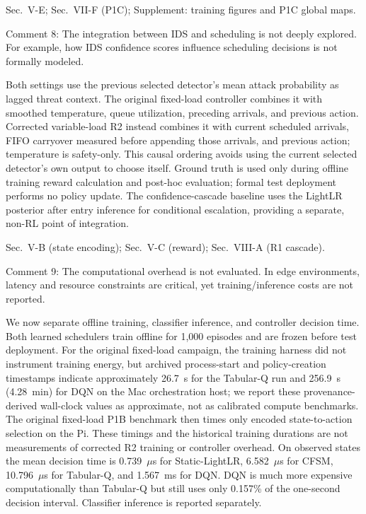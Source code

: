 \documentclass[10pt,a4paper]{article}
\begin{document}
\begin{wherebox}
Sec.~V-E; Sec.~VII-F (P1C); Supplement: training figures and P1C global maps.
\end{wherebox}

\begin{rcommentbox}
Comment 8: The integration between IDS and scheduling is not deeply explored. For example, how IDS confidence scores influence scheduling decisions is not formally modeled.
\end{rcommentbox}

\begin{authorresponsebox}
Both settings use the previous selected detector's mean attack probability as lagged threat context. The original fixed-load controller combines it with smoothed temperature, queue utilization, preceding arrivals, and previous action. Corrected variable-load R2 instead combines it with current scheduled arrivals, FIFO carryover measured before appending those arrivals, and previous action; temperature is safety-only. This causal ordering avoids using the current selected detector's own output to choose itself. Ground truth is used only during offline training reward calculation and post-hoc evaluation; formal test deployment performs no policy update. The confidence-cascade baseline uses the LightLR posterior after entry inference for conditional escalation, providing a separate, non-RL point of integration.
\end{authorresponsebox}

\begin{wherebox}
Sec.~V-B (state encoding); Sec.~V-C (reward); Sec.~VIII-A (R1 cascade).
\end{wherebox}

\begin{rcommentbox}
Comment 9: The computational overhead is not evaluated. In edge environments, latency and resource constraints are critical, yet training/inference costs are not reported.
\end{rcommentbox}

\begin{authorresponsebox}
We now separate offline training, classifier inference, and controller decision time. Both learned schedulers train offline for 1{,}000 episodes and are frozen before test deployment. For the original fixed-load campaign, the training harness did not instrument training energy, but archived process-start and policy-creation timestamps indicate approximately 26.7~s for the Tabular-Q run and 256.9~s (4.28~min) for DQN on the Mac orchestration host; we report these provenance-derived wall-clock values as approximate, not as calibrated compute benchmarks. The original fixed-load P1B benchmark then times only encoded state-to-action selection on the Pi. These timings and the historical training durations are not measurements of corrected R2 training or controller overhead. On observed states the mean decision time is 0.739~$\mu$s for Static-LightLR, 6.582~$\mu$s for CFSM, 10.796~$\mu$s for Tabular-Q, and 1.567~ms for DQN. DQN is much more expensive computationally than Tabular-Q but still uses only 0.157\% of the one-second decision interval. Classifier inference is reported separately.
\end{authorresponsebox}
\end{document}
